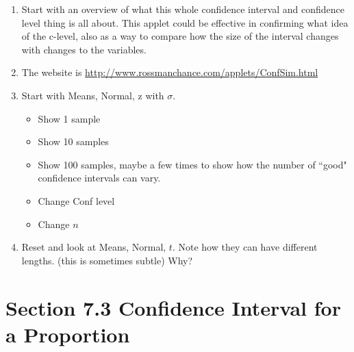 \documentclass{article}
\begin{document}
\begin{enumerate}

    \item Start with an overview of what this whole confidence interval and confidence level thing is all about. This applet could be effective in confirming what idea of the c-level, also as a way to compare how the size of the interval changes with changes to the variables.
    
    \item The website is \url{http://www.rossmanchance.com/applets/ConfSim.html}
    
    \item Start with Means, Normal, z with $\sigma$.
    
        \begin{itemize}
        
            \item Show 1 sample
            
            \item Show 10 samples
            
            \item Show 100 samples, maybe a few times to show how the number of ``good" confidence intervals can vary.
            
            \item Change Conf level
            
            \item Change $n$
            
        \end{itemize}
        
    \item Reset and look at Means, Normal, $t$. Note how they can have different lengths. (this is sometimes subtle)  Why?
    
\end{enumerate}

\section*{Section 7.3 Confidence Interval for a Proportion}
\end{document}
